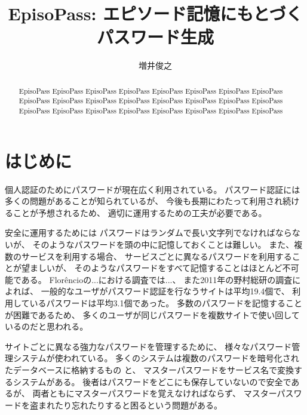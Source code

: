\documentclass[twoside]{wiss}
\begin{document}
\title{EpisoPass: エピソード記憶にもとづくパスワード生成}

\author{増井俊之}

\begin{abstract}
EpisoPass EpisoPass EpisoPass EpisoPass EpisoPass EpisoPass 
EpisoPass EpisoPass EpisoPass EpisoPass EpisoPass EpisoPass 
EpisoPass EpisoPass EpisoPass EpisoPass EpisoPass EpisoPass 
EpisoPass EpisoPass EpisoPass EpisoPass EpisoPass EpisoPass 
\end{abstract}

\maketitle

\section{はじめに}

個人認証のためにパスワードが現在広く利用されている。
パスワード認証には多くの問題があることが知られているが\cite{増井_ユニマガ}、
今後も長期にわたって利用され続けることが予想されるため、
適切に運用するための工夫が必要である。

安全に運用するためには
パスワードはランダムで長い文字列でなければならないが、
そのようなパスワードを頭の中に記憶しておくことは難しい。
また、複数のサービスを利用する場合、
サービスごとに異なるパスワードを利用することが望ましいが、
そのようなパスワードをすべて記憶することはほとんど不可能である。
%
Flor\^{e}ncioの...における調査では...\cite{Florencio:2007:LSW:1242572.1242661}、
また2011年の野村総研の調査によれば、
一般的なユーザがパスワード認証を行なうサイトは平均19.4個で、
利用しているパスワードは平均3.1個であった\cite{野村総研}。
多数のパスワードを記憶することが困難であるため、
多くのユーザが同じパスワードを複数サイトで使い回しているのだと思われる。

サイトごとに異なる強力なパスワードを管理するために、
様々なパスワード管理システムが使われている。
多くのシステムは複数のパスワードを暗号化されたデータベースに格納するもの
\cite{OnePassword}\cite{Dashlane}\cite{ミルパス}\cite{LastPass}\cite{KeyPass}\cite{NortonIDSafe}\cite{IDManager}と、
マスターパスワードをサービス名で変換するシステムがある\cite{SuperGenPass}。
後者はパスワードをどこにも保存していないので安全であるが、
両者ともにマスターパスワードを覚えなければならず、
マスターパスワードを盗まれたり忘れたりすると困るという問題がある。
\end{document}
